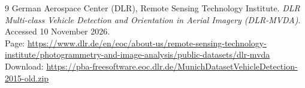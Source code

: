 \documentclass[12pt,a4paper]{article}
\begin{document}
\clearpage
{}
\begin{thebibliography}{9}
 German Aerospace Center (DLR), Remote Sensing Technology
  Institute. \emph{DLR Multi-class Vehicle Detection and Orientation in Aerial
  Imagery (DLR-MVDA)}. Accessed 10 November 2026. \\
  Page: \url{https://www.dlr.de/en/eoc/about-us/remote-sensing-technology-institute/photogrammetry-and-image-analysis/public-datasets/dlr-mvda} \\
  Download: \url{https://pba-freesoftware.eoc.dlr.de/MunichDatasetVehicleDetection-2015-old.zip}
\end{thebibliography}
\end{document}
